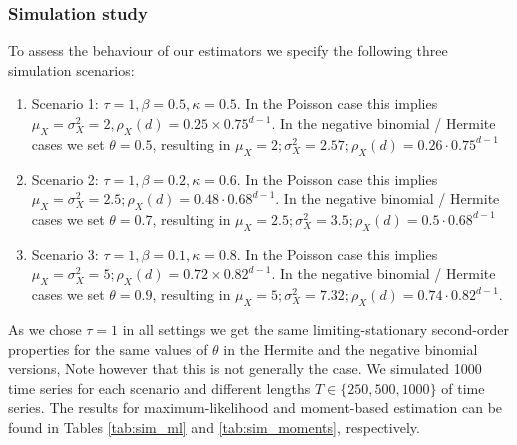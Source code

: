 \documentclass{article}
\begin{document}




\subsubsection{Simulation study}

To assess the behaviour of our estimators we specify the following three simulation scenarios:


\begin{enumerate}
\item Scenario 1: $\tau = 1, \beta = 0.5, \kappa = 0.5$. In the Poisson case this implies $\mu_X = \sigma^2_X = 2, \rho_X(d) = 0.25 \times 0.75^{d - 1}$. In the negative binomial / Hermite cases we set $\theta = 0.5$, resulting in $\mu_X = 2; \sigma^2_X = 2.57; \rho_X(d) = 0.26\cdot 0.75^{d - 1}$
\item Scenario 2: $\tau = 1, \beta = 0.2, \kappa = 0.6$. In the Poisson case this implies $\mu_X = \sigma^2_X = 2.5; \rho_X(d) = 0.48 \cdot 0.68^{d - 1}$. In the negative binomial / Hermite cases we set $\theta = 0.7$, resulting in $\mu_X = 2.5; \sigma^2_X = 3.5; \rho_X(d) = 0.5\cdot 0.68^{d - 1}$
\item Scenario 3: $\tau = 1, \beta = 0.1, \kappa = 0.8$. In the Poisson case this implies $\mu_X = \sigma^2_X = 5; \rho_X(d) = 0.72 \times 0.82^{d - 1}$. In the negative binomial / Hermite cases we set $\theta = 0.9$, resulting in $\mu_X = 5; \sigma^2_X = 7.32; \rho_X(d) = 0.74\cdot 0.82^{d - 1}$.\end{enumerate}

\noindent As we chose $\tau = 1$ in all settings we get the same limiting-stationary second-order properties for the same values of $\theta$ in the Hermite and the negative binomial versions,  Note however that this is not generally the case. We simulated 1000 time series for each scenario and different lengths $T \in \{250, 500, 1000\}$ of time series. The results for maximum-likelihood and moment-based estimation can be found in Tables \ref{tab:sim_ml} and \ref{tab:sim_moments}, respectively.
\end{document}
